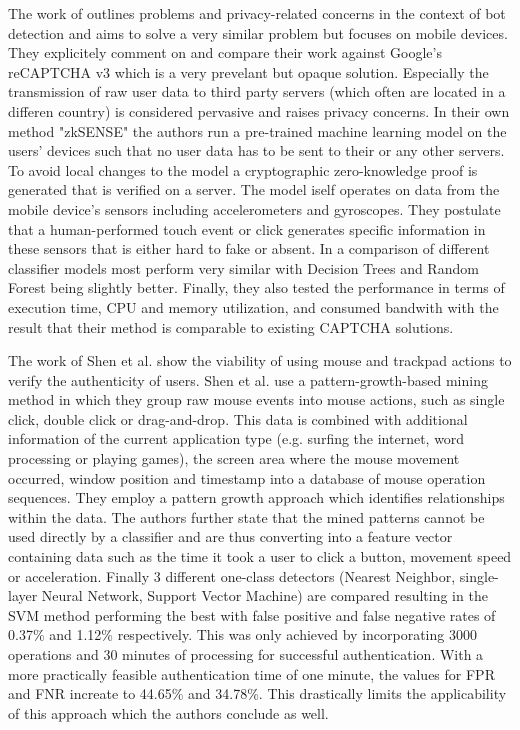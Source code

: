 \documentclass[
    fontsize=12pt,
    headings=small,
    parskip=half,           %
    bibliography=totoc,
    numbers=noenddot,       %
    open=any,               %
    final                   %
]{scrreprt}
\begin{document}
The work of \cite{PETS2021} outlines problems and privacy-related concerns in the context of bot detection and aims to solve a very similar problem but focuses on mobile devices. They explicitely comment on and compare their work against Google's reCAPTCHA v3 \cite{RECPATCHA_V3} which is a very prevelant but opaque solution. Especially the transmission of raw user data to third party servers (which often are located in a differen country) is considered pervasive and raises privacy concerns. In their own method "zkSENSE" the authors run a pre-trained machine learning model on the users' devices such that no user data has to be sent to their or any other servers. To avoid local changes to the model a cryptographic zero-knowledge proof is generated that is verified on a server. The model iself operates on data from the mobile device's sensors including accelerometers and gyroscopes. They postulate that a human-performed touch event or click generates specific information in these sensors that is either hard to fake or absent. In a comparison of different classifier models most perform very similar with Decision Trees and Random Forest being slightly better. Finally, they also tested the performance in terms of execution time, CPU and memory utilization, and consumed bandwith with the result that their method is comparable to existing CAPTCHA solutions.


The work of Shen et al. \cite{6263955} show the viability of using mouse and trackpad actions to verify the authenticity of users. Shen et al. use a pattern-growth-based mining method in which they group raw mouse events into mouse actions, such as single click, double click or drag-and-drop. This data is combined with additional information of the current application type (e.g. surfing the internet, word processing or playing games), the screen area where the mouse movement occurred, window position and timestamp into a database of mouse operation sequences. They employ a pattern growth approach which identifies relationships within the data. The authors further state that the mined patterns cannot be used directly by a classifier and are thus converting into a feature vector containing data such as the time it took a user to click a button, movement speed or acceleration. Finally 3 different one-class detectors (Nearest Neighbor, single-layer Neural Network, Support Vector Machine) are compared resulting in the SVM method performing the best with false positive and false negative rates of 0.37\% and 1.12\% respectively. This was only achieved by incorporating 3000 operations and 30 minutes of processing for successful authentication. With a more practically feasible authentication time of one minute, the values for FPR and FNR increate to 44.65\% and 34.78\%. This drastically limits the applicability of this approach which the authors conclude as well.
\end{document}

